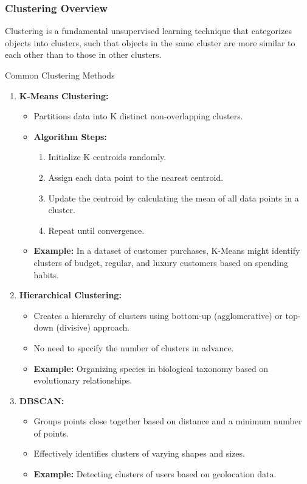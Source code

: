 \documentclass[aspectratio=169]{beamer}
\begin{document}
\begin{frame}[fragile]
    \frametitle{Clustering Overview}
    Clustering is a fundamental unsupervised learning technique that categorizes objects into clusters, such that objects in the same cluster are more similar to each other than to those in other clusters.

    \begin{block}{Common Clustering Methods}
        \begin{enumerate}
            \item \textbf{K-Means Clustering:} 
            \begin{itemize}
                \item Partitions data into K distinct non-overlapping clusters.
                \item \textbf{Algorithm Steps:}
                \begin{enumerate}
                    \item Initialize K centroids randomly.
                    \item Assign each data point to the nearest centroid.
                    \item Update the centroid by calculating the mean of all data points in a cluster.
                    \item Repeat until convergence.
                \end{enumerate}
                \item \textbf{Example:} In a dataset of customer purchases, K-Means might identify clusters of budget, regular, and luxury customers based on spending habits.
            \end{itemize}

            \item \textbf{Hierarchical Clustering:}
            \begin{itemize}
                \item Creates a hierarchy of clusters using bottom-up (agglomerative) or top-down (divisive) approach.
                \item No need to specify the number of clusters in advance.
                \item \textbf{Example:} Organizing species in biological taxonomy based on evolutionary relationships.
            \end{itemize}

            \item \textbf{DBSCAN:}
            \begin{itemize}
                \item Groups points close together based on distance and a minimum number of points.
                \item Effectively identifies clusters of varying shapes and sizes.
                \item \textbf{Example:} Detecting clusters of users based on geolocation data.
            \end{itemize}
        \end{enumerate}
    \end{block}
\end{frame}
\end{document}
